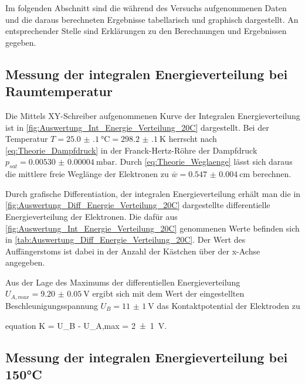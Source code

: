 Im folgenden Abschnitt sind die während des Versuchs aufgenommenen Daten 
und die daraus berechneten Ergebnisse tabellarisch und graphisch dargestellt.
An entsprechender Stelle sind Erklärungen zu den Berechnungen
und Ergebnissen gegeben.  

\subsection{Messung der integralen Energieverteilung bei Raumtemperatur}
	
	Die Mittels XY-Schreiber aufgenommenen Kurve der Integralen Energieverteilung ist 
	in \cref{fig:Auswertung_Int_Energie_Verteilung_20C} dargestellt. Bei der Temperatur
	$T =\SI{25.0(1)}{\degreeCelsius} = \SI{298.2(1)}{\kelvin}$ herrscht nach \cref{eq:Theorie_Dampfdruck} in der 
	Franck-Hertz-Röhre der Dampfdruck $p_{sat} = \SI{0.00530(4)}{\milli\bar}$. Durch \cref{eq:Theorie_Weglaenge}
	lässt sich daraus die mittlere freie Weglänge der Elektronen zu $\bar{w} = \SI{0.547(4)}{\cm}$ berechnen.
	
	
	Durch grafische Differentiation, der integralen Energieverteilung erhält man die in
	\cref{fig:Auswertung_Diff_Energie_Verteilung_20C} dargestellte differentielle Energieverteilung
	der Elektronen. Die dafür aus \cref{fig:Auswertung_Int_Energie_Verteilung_20C} genommenen Werte
	befinden sich in \cref{tab:Auswertung_Diff_Energie_Verteilung_20C}. Der Wert des Auffängerstoms
	ist dabei in der Anzahl der Kästchen über der x-Achse angegeben. 
	
	
	
	
	Aus der Lage des Maximums der differentiellen Energieverteilung $U_{A,max} = \SI{9.20(5)}{\volt}$ 
	ergibt sich mit dem Wert der eingestellten Beschleunigungsspannung $U_{B} = \SI{11(1)}{\volt}$ das
	Kontaktpotential der Elektroden zu 
	\begin{empheq}{equation}
			K = U_{B} - U_{A,max} = \SI{2(1)}{\volt}.  
		    \label{val:Auswertung_K_1}
	\end{empheq}
	
			
\subsection{Messung der integralen Energieverteilung bei 150°C}
	
